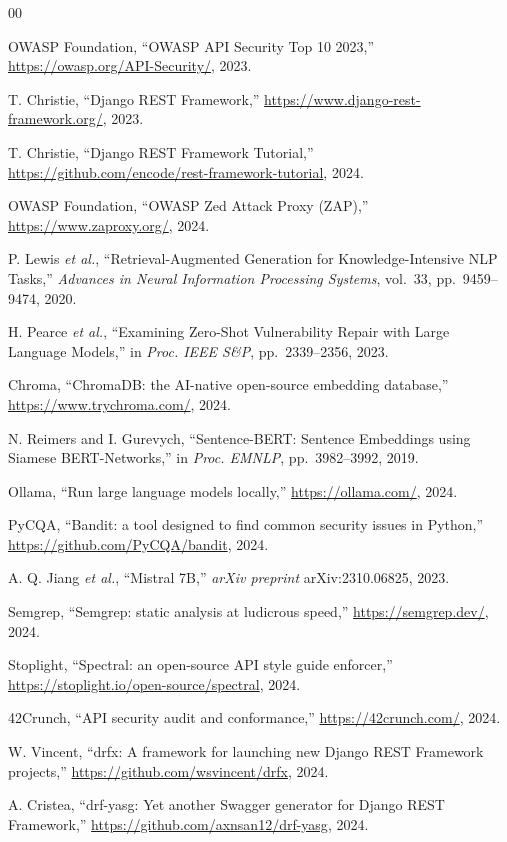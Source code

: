 \documentclass[conference]{IEEEtran}
\begin{document}
\begin{thebibliography}{00}

OWASP Foundation, ``OWASP API Security Top 10 2023,''
\url{https://owasp.org/API-Security/}, 2023.

T. Christie, ``Django REST Framework,''
\url{https://www.django-rest-framework.org/}, 2023.

T. Christie, ``Django REST Framework Tutorial,''
\url{https://github.com/encode/rest-framework-tutorial}, 2024.

OWASP Foundation, ``OWASP Zed Attack Proxy (ZAP),''
\url{https://www.zaproxy.org/}, 2024.

P. Lewis \textit{et al.}, ``Retrieval-Augmented Generation for
Knowledge-Intensive NLP Tasks,'' \textit{Advances in Neural Information
Processing Systems}, vol.~33, pp.~9459--9474, 2020.

H. Pearce \textit{et al.}, ``Examining Zero-Shot Vulnerability Repair with
Large Language Models,'' in \textit{Proc. IEEE S\&P}, pp.~2339--2356, 2023.

Chroma, ``ChromaDB: the AI-native open-source embedding database,''
\url{https://www.trychroma.com/}, 2024.

N. Reimers and I. Gurevych, ``Sentence-BERT: Sentence Embeddings using
Siamese BERT-Networks,'' in \textit{Proc. EMNLP}, pp.~3982--3992, 2019.

Ollama, ``Run large language models locally,''
\url{https://ollama.com/}, 2024.

PyCQA, ``Bandit: a tool designed to find common security issues in Python,''
\url{https://github.com/PyCQA/bandit}, 2024.

A. Q. Jiang \textit{et al.}, ``Mistral 7B,''
\textit{arXiv preprint} arXiv:2310.06825, 2023.

Semgrep, ``Semgrep: static analysis at ludicrous speed,''
\url{https://semgrep.dev/}, 2024.

Stoplight, ``Spectral: an open-source API style guide enforcer,''
\url{https://stoplight.io/open-source/spectral}, 2024.

42Crunch, ``API security audit and conformance,''
\url{https://42crunch.com/}, 2024.

W. Vincent, ``drfx: A framework for launching new Django REST Framework projects,''
\url{https://github.com/wsvincent/drfx}, 2024.

A. Cristea, ``drf-yasg: Yet another Swagger generator for Django REST Framework,''
\url{https://github.com/axnsan12/drf-yasg}, 2024.

\end{thebibliography}
\end{document}
